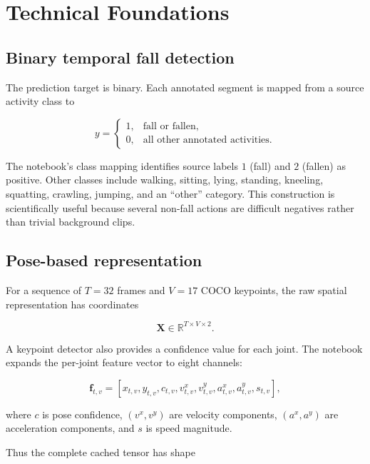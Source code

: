 \documentclass[11pt,a4paper]{article}
\newcommand{\R}{\mathbb{R}}
\begin{document}
\section{Technical Foundations}

\subsection{Binary temporal fall detection}

The prediction target is binary. Each annotated segment is mapped from a source activity class to

\begin{equation}
y =
\begin{cases}
1, & \text{fall or fallen},\\
0, & \text{all other annotated activities}.
\end{cases}
\end{equation}

The notebook's class mapping identifies source labels $1$ (fall) and $2$ (fallen) as positive. Other classes include walking, sitting, lying, standing, kneeling, squatting, crawling, jumping, and an ``other'' category. This construction is scientifically useful because several non-fall actions are difficult negatives rather than trivial background clips.

\subsection{Pose-based representation}

For a sequence of $T=32$ frames and $V=17$ COCO keypoints, the raw spatial representation has coordinates

\begin{equation}
\mathbf{X} \in \R^{T\times V\times 2}.
\end{equation}

A keypoint detector also provides a confidence value for each joint. The notebook expands the per-joint feature vector to eight channels:

\begin{equation}
\mathbf{f}_{t,v}
=
\left[
x_{t,v},
y_{t,v},
c_{t,v},
v^x_{t,v},
v^y_{t,v},
a^x_{t,v},
a^y_{t,v},
s_{t,v}
\right],
\end{equation}

where $c$ is pose confidence, $(v^x,v^y)$ are velocity components, $(a^x,a^y)$ are acceleration components, and $s$ is speed magnitude.

Thus the complete cached tensor has shape
\end{document}
